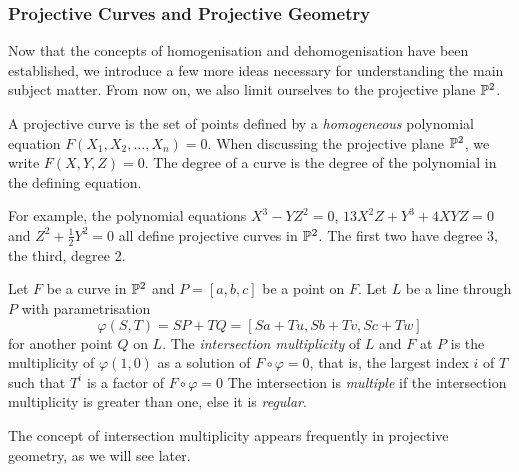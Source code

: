 \subsubsection{Projective Curves and Projective Geometry}
Now that the concepts of homogenisation and dehomogenisation have been established, we introduce a few more ideas necessary for understanding the main subject matter.
From now on, we also limit ourselves to the projective plane $\pn[2]$.

\begin{definition}
	A projective curve is the set of points defined by a \emph{homogeneous} polynomial equation $F(X_1,X_2,\ldots,X_n) = 0$.
	When discussing the projective plane $\pn[2]$, we write $F(X,Y,Z) = 0$.
	The degree of a curve is the degree of the polynomial in the defining equation.
\end{definition}
For example, the polynomial equations $X^3-YZ^2=0$, $13X^2Z + Y^3 + 4XYZ = 0$ and $Z^2 + \frac{1}{2}Y^2 = 0$ all define projective curves in $\pn[2]$.
The first two have degree 3, the third, degree 2.

\begin{definition}
	Let $F$ be a curve in $\pn[2]$ and $P=[a,b,c]$ be a point on $F$.
	Let $L$ be a line through $P$ with parametrisation
	$$\varphi(S,T) = SP + TQ = [Sa+Tu,Sb+Tv,Sc+Tw]$$
	for another point $Q$ on $L$.
	The \emph{intersection multiplicity} of $L$ and $F$ at $P$ is the multiplicity of $\varphi(1,0)$ as a solution of $F \circ \varphi = 0$, that is, the largest index $i$ of $T$ such that $T^i$ is a factor of $F \circ \varphi = 0$
	The intersection is \emph{multiple} if the intersection multiplicity is greater than one, else it is \emph{regular}.
	\label{intersection-multiplicity}
\end{definition}
The concept of intersection multiplicity appears frequently in projective geometry, as we will see later.

